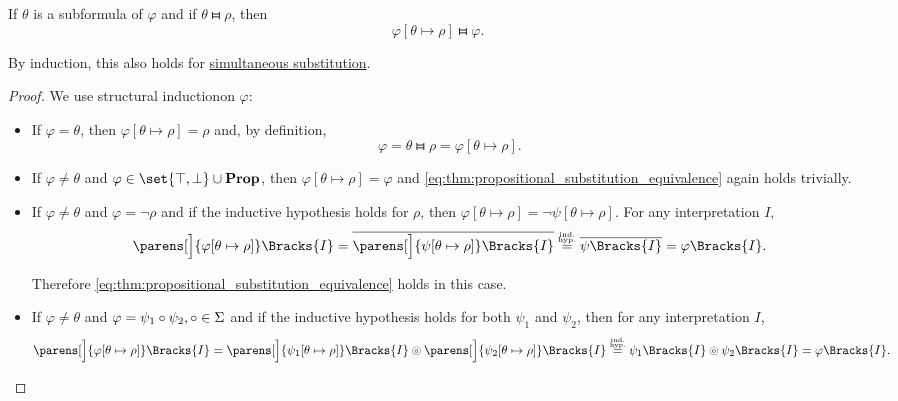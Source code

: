 \begin{proposition}\label{thm:propositional_substitution_equivalence}
  If \( \theta \) is a subformula of \( \varphi \) and if \( \theta \gleichstark \rho \), then
  \begin{equation}\label{eq:thm:propositional_substitution_equivalence}
    \varphi[\theta \mapsto \rho] \gleichstark \varphi.
  \end{equation}

  By induction, this also holds for \hyperref[def:propositional_substitution/simultaneous]{simultaneous substitution}.
\end{proposition}
\begin{proof}
  We use structural induction\IND on \( \varphi \):

  \begin{itemize}
    \item If \( \varphi = \theta \), then \( \varphi[\theta \mapsto \rho] = \rho \) and, by definition,
    \begin{equation*}
      \varphi = \theta \gleichstark \rho = \varphi[\theta \mapsto \rho].
    \end{equation*}

    \item If \( \varphi \neq \theta \) and \( \varphi \in \set{ \top, \bot } \cup \boldop{Prop} \), then \( \varphi[\theta \mapsto \rho] = \varphi \) and \eqref{eq:thm:propositional_substitution_equivalence} again holds trivially.

    \item If \( \varphi \neq \theta \) and \( \varphi = \neg \rho \) and if the inductive hypothesis holds for \( \rho \), then \( \varphi[\theta \mapsto \rho] = \neg \psi[\theta \mapsto \rho] \). For any interpretation \( I \),
    \begin{equation*}
      \parens[\Big]{ \varphi[\theta \mapsto \rho] }\Bracks{I}
      =
      \overline{\parens[\Big]{ \psi[\theta \mapsto \rho] }\Bracks{I}}
      \overset {\IndHyp} =
      \overline{\psi\Bracks{I}}
      =
      \varphi\Bracks{I}.
    \end{equation*}

    Therefore \eqref{eq:thm:propositional_substitution_equivalence} holds in this case.

    \item If \( \varphi \neq \theta \) and \( \varphi = \psi_1 \mathbin {\circ} \psi_2, \mathbin {\circ} \in \Sigma \) and if the inductive hypothesis holds for both \( \psi_1 \) and \( \psi_2 \), then for any interpretation \( I \),
    \begin{equation*}
      \parens[\Big]{ \varphi[\theta \mapsto \rho] }\Bracks{I}
      =
      \parens[\Big]{ \psi_1[\theta \mapsto \rho] }\Bracks{I} \circledcirc \parens[\Big]{ \psi_2[\theta \mapsto \rho] }\Bracks{I}
      \overset {\IndHyp} =
      \psi_1\Bracks{I} \circledcirc \psi_2\Bracks{I}
      =
      \varphi\Bracks{I}.
    \end{equation*}


\end{itemize}
\end{proof}
